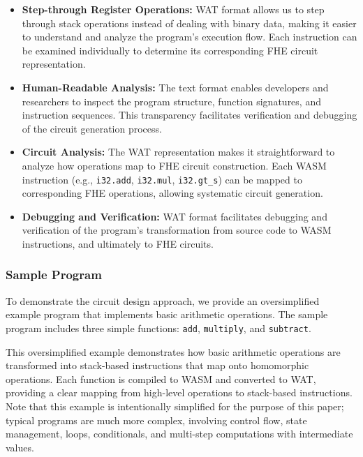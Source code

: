 \documentclass[12pt,a4paper]{article}
\begin{document}
\begin{itemize}
    \item \textbf{Step-through Register Operations:} WAT format allows us to step through stack operations instead of dealing with binary data, making it easier to understand and analyze the program's execution flow.
    Each instruction can be examined individually to determine its corresponding FHE circuit representation.

    \item \textbf{Human-Readable Analysis:} The text format enables developers and researchers to inspect the program structure, function signatures, and instruction sequences.
    This transparency facilitates verification and debugging of the circuit generation process.

    \item \textbf{Circuit Analysis:} The WAT representation makes it straightforward to analyze how operations map to FHE circuit construction.
    Each WASM instruction (e.g., \texttt{i32.add}, \texttt{i32.mul}, \texttt{i32.gt\_s}) can be mapped to corresponding FHE operations, allowing systematic circuit generation.

    \item \textbf{Debugging and Verification:} WAT format facilitates debugging and verification of the program's transformation from source code to WASM instructions, and ultimately to FHE circuits.
\end{itemize}

\subsubsection{Sample Program}

To demonstrate the circuit design approach, we provide an oversimplified example program that implements basic arithmetic operations.
The sample program includes three simple functions: \texttt{add}, \texttt{multiply}, and \texttt{subtract}.

This oversimplified example demonstrates how basic arithmetic operations are transformed into stack-based instructions that map onto homomorphic operations.
Each function is compiled to WASM and converted to WAT, providing a clear mapping from high-level operations to stack-based instructions.
Note that this example is intentionally simplified for the purpose of this paper; typical programs are much more complex, involving control flow, state management, loops, conditionals, and multi-step computations with intermediate values.
\end{document}
